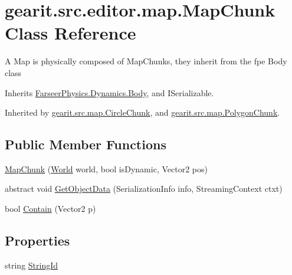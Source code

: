 \hypertarget{classgearit_1_1src_1_1editor_1_1map_1_1_map_chunk}{\section{gearit.\+src.\+editor.\+map.\+Map\+Chunk Class Reference}
\label{classgearit_1_1src_1_1editor_1_1map_1_1_map_chunk}
}


A Map is physically composed of Map\+Chunks, they inherit from the fpe Body class  




Inherits \hyperlink{class_farseer_physics_1_1_dynamics_1_1_body}{Farseer\+Physics.\+Dynamics.\+Body}, and I\+Serializable.



Inherited by \hyperlink{classgearit_1_1src_1_1map_1_1_circle_chunk}{gearit.\+src.\+map.\+Circle\+Chunk}, and \hyperlink{classgearit_1_1src_1_1map_1_1_polygon_chunk}{gearit.\+src.\+map.\+Polygon\+Chunk}.

\subsection*{Public Member Functions}
\begin{DoxyCompactItemize}
\item 
\hyperlink{classgearit_1_1src_1_1editor_1_1map_1_1_map_chunk_ae0b8b7bcca9b23597369a727ed0da1a5}{Map\+Chunk} (\hyperlink{class_farseer_physics_1_1_dynamics_1_1_world}{World} world, bool is\+Dynamic, Vector2 pos)
\item 
abstract void \hyperlink{classgearit_1_1src_1_1editor_1_1map_1_1_map_chunk_a1e4a9bbf8186e0e06de790b9dc89fc2b}{Get\+Object\+Data} (Serialization\+Info info, Streaming\+Context ctxt)
\item 
bool \hyperlink{classgearit_1_1src_1_1editor_1_1map_1_1_map_chunk_aba26fed284b9daf6b705d1febc24e133}{Contain} (Vector2 p)
\end{DoxyCompactItemize}
\subsection*{Properties}
\begin{DoxyCompactItemize}
\item 
string \hyperlink{classgearit_1_1src_1_1editor_1_1map_1_1_map_chunk_ad9d6f2c5ffd94987364e86f932e6df92}{String\+Id}
\end{DoxyCompactItemize}
